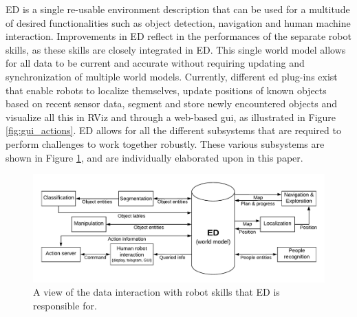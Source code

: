 \noindent ED is a single re-usable environment description that can be used for a multitude of desired functionalities such as object detection, navigation and human machine interaction. Improvements in ED reflect in the performances of the separate robot skills, as these skills are closely integrated in ED. This single world model allows for all data to be current and accurate without requiring updating and synchronization of multiple world models. Currently, different \acrshort{ed} plug-ins exist that enable robots to localize themselves, update positions of known objects based on recent sensor data, segment and store newly encountered objects and visualize all this in RViz and through a web-based \acrshort{gui}, as illustrated in Figure \ref{fig:gui_actions}. ED allows for all the different subsystems that are required to perform challenges to work together robustly. These various subsystems are shown in Figure \ref{fig:sub_overview}, and are individually elaborated upon in this paper. 
\begin{figure}[H]
	\centering
	\vspace{-0.5cm}
	\includegraphics[width=\linewidth]{Figures/overview_subsystems}
	\vspace{-0.5em}
	\caption{A view of the data interaction with robot skills that ED is responsible for.}
	\label{fig:sub_overview}
	\vspace{-0.4cm}
\end{figure}


